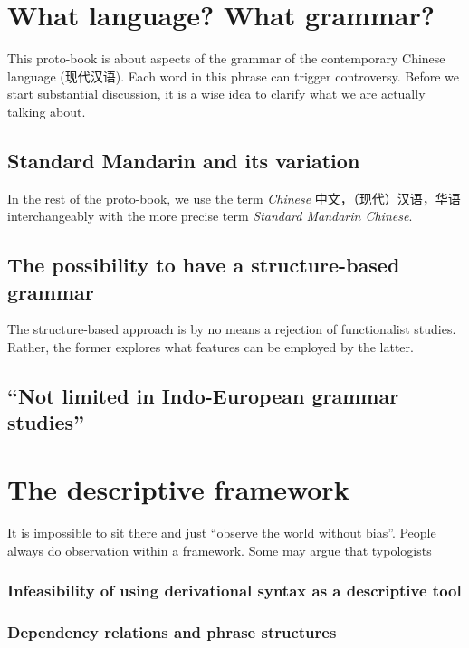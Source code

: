 \documentclass[../main.tex]{subfiles}
\begin{document}
\section{What language? What grammar?}

This proto-book is about aspects of the grammar of the contemporary Chinese language (现代汉语). 
Each word in this phrase can trigger controversy. Before we start substantial discussion, it is a wise idea 
to clarify what we are actually talking about. 

\subsection{Standard Mandarin and its variation}


In the rest of the proto-book, we use the term \emph{Chinese} 中文，（现代）汉语，华语 interchangeably with 
the more precise term \emph{Standard Mandarin Chinese}.

\subsection{The possibility to have a structure-based grammar}

The structure-based approach is by no means a rejection of functionalist studies. Rather, the former explores 
what features can be employed by the latter.

\subsection{``Not limited in Indo-European grammar studies''}


\section{The descriptive framework}

It is impossible to sit there and just ``observe the world without bias''. People always do observation within a 
framework. Some may argue that typologists 

\subsubsection{Infeasibility of using derivational syntax as a descriptive tool}

\subsubsection{Dependency relations and phrase structures}
\end{document}
